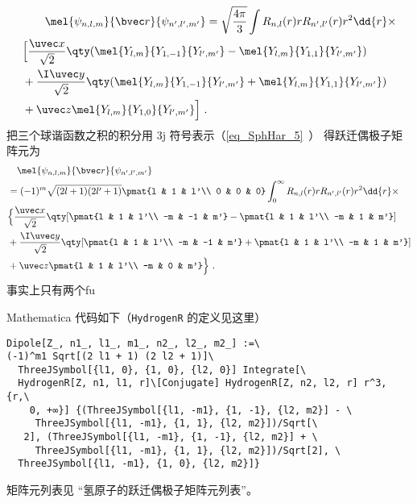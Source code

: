 \begin{equation}
\begin{aligned}
&\qquad \mel{\psi_{n,l,m}}{\bvec r}{\psi_{n',l',m'}}
= \sqrt{\frac{4\pi}{3}}\int R_{n,l}(r) r R_{n',l'}(r) r^2 \dd{r}\times\\
&\Big[\frac{\uvec x}{\sqrt 2} \qty(\mel{Y_{l,m}}{Y_{1,-1}}{Y_{l',m'}} - \mel{Y_{l,m}}{Y_{1,1}}{Y_{l',m'}})\\
&+ \frac{\I \uvec y}{\sqrt 2} \qty(\mel{Y_{l,m}}{Y_{1,-1}}{Y_{l',m'}} + \mel{Y_{l,m}}{Y_{1,1}}{Y_{l',m'}})\\
&+ \uvec z\mel{Y_{l,m}}{Y_{1,0}}{Y_{l',m'}}\Big]~.
\end{aligned}
\end{equation}
把三个球谐函数之积的积分用 3j 符号表示（\autoref{eq_SphHar_5}~） 得跃迁偶极子矩阵元为
\begin{equation}
\begin{aligned}
&\quad\mel{\psi_{n,l,m}}{\bvec r}{\psi_{n',l',m'}}\\
&= (-1)^m\sqrt{(2l+1)(2l'+1)} \pmat{l & 1 & l'\\ 0 & 0 & 0} \int_0^\infty R_{n,l}(r) r R_{n',l'}(r) r^2 \dd{r}\times\\
&\Big\{\frac{\uvec x}{\sqrt 2} \qty[\pmat{l & 1 & l'\\ -m & -1 & m'} - \pmat{l & 1 & l'\\ -m & 1 & m'}]\\
&+ \frac{\I \uvec y}{\sqrt 2} \qty[\pmat{l & 1 & l'\\ -m & -1 & m'} + \pmat{l & 1 & l'\\ -m & 1 & m'}]\\
&+  \uvec z \pmat{l & 1 & l'\\ -m & 0 & m'}\Big\}~.
\end{aligned}
\end{equation}
事实上只有两个fu

Mathematica 代码如下（\verb|HydrogenR| 的定义见这里）
\begin{lstlisting}[language=mma]
Dipole[Z_, n1_, l1_, m1_, n2_, l2_, m2_] :=\
(-1)^m1 Sqrt[(2 l1 + 1) (2 l2 + 1)]\
  ThreeJSymbol[{l1, 0}, {1, 0}, {l2, 0}] Integrate[\
  HydrogenR[Z, n1, l1, r]\[Conjugate] HydrogenR[Z, n2, l2, r] r^3, {r,\
    0, +∞}] {(ThreeJSymbol[{l1, -m1}, {1, -1}, {l2, m2}] - \
     ThreeJSymbol[{l1, -m1}, {1, 1}, {l2, m2}])/Sqrt[\
   2], (ThreeJSymbol[{l1, -m1}, {1, -1}, {l2, m2}] + \
     ThreeJSymbol[{l1, -m1}, {1, 1}, {l2, m2}])/Sqrt[2], \
  ThreeJSymbol[{l1, -m1}, {1, 0}, {l2, m2}]}
\end{lstlisting}
矩阵元列表见 “氢原子的跃迁偶极子矩阵元列表\upref{HDipM}”。


